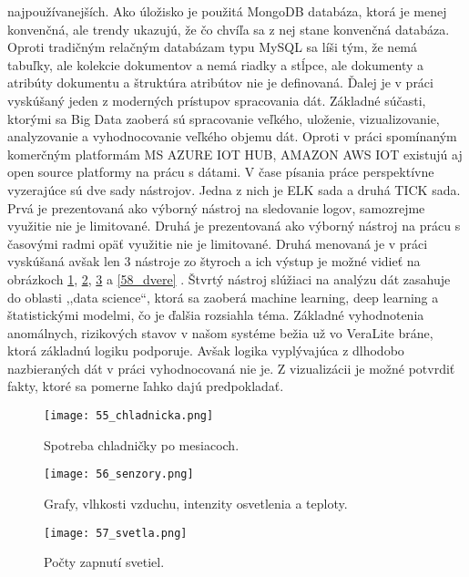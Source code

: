 najpoužívanejších. Ako úložisko je použitá MongoDB databáza, ktorá je menej konvenčná, ale trendy ukazujú, že čo chvíľa sa z nej stane konvenčná  databáza. Oproti tradičným relačným databázam typu MySQL sa líši tým, že nemá tabuľky, ale kolekcie dokumentov a nemá riadky a stĺpce, ale dokumenty a atribúty dokumentu a štruktúra atribútov nie je definovaná. Ďalej je v práci vyskúšaný jeden z moderných prístupov spracovania dát. Základné súčasti, ktorými sa Big Data zaoberá sú spracovanie veľkého, uloženie, vizualizovanie, analyzovanie a vyhodnocovanie veľkého objemu dát. Oproti v práci spomínaným komerčným platformám MS AZURE IOT HUB, AMAZON AWS IOT existujú aj open source platformy na prácu s dátami. V čase písania práce perspektívne vyzerajúce sú dve sady nástrojov. Jedna z nich je ELK \cite{IOT34} sada a druhá TICK \cite{IOT33} sada. Prvá je prezentovaná ako výborný nástroj na sledovanie logov, samozrejme využitie nie je limitované. Druhá je prezentovaná ako výborný nástroj na prácu s časovými radmi opäť využitie nie je limitované. Druhá menovaná je v práci vyskúšaná avšak len 3 nástroje zo štyroch a ich výstup je možné vidieť na obrázkoch \ref{55_chladnicka}, \ref{56_senzory}, \ref{57_svetla} a \ref{58_dvere} . Štvrtý nástroj slúžiaci na analýzu dát zasahuje do oblasti ,,data science``, ktorá sa zaoberá machine learning, deep learning a štatistickými modelmi, čo je ďalšia rozsiahla téma. Základné vyhodnotenia anomálnych, rizikových stavov v našom systéme bežia už vo VeraLite bráne, ktorá základnú logiku podporuje. Avšak logika vyplývajúca z dlhodobo nazbieraných dát v práci vyhodnocovaná nie je. Z vizualizácii je možné potvrdiť fakty, ktoré sa pomerne ľahko dajú predpokladať.

\begin{figure}[!htbp]
\centering
\texttt{[image: 55\_chladnicka.png]}
\caption{Spotreba chladničky po mesiacoch.}
\label{55_chladnicka}
\end{figure}

\begin{figure}[!htbp]
\centering
\texttt{[image: 56\_senzory.png]}
\caption{Grafy, vlhkosti vzduchu, intenzity osvetlenia a teploty.}
\label{56_senzory}
\end{figure}

\begin{figure}[!htbp]
\centering
\texttt{[image: 57\_svetla.png]}
\caption{Počty zapnutí svetiel.}
\label{57_svetla}
\end{figure}

